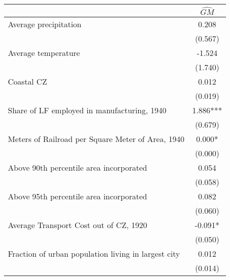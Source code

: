  \begin{tabular}{l*{1}{c}} \toprule
                &\multicolumn{1}{c}{$\widehat{GM}$}\\
\midrule
Average precipitation&    0.208   \\
                &  (0.567)   \\
\addlinespace
Average temperature&   -1.524   \\
                &  (1.740)   \\
\addlinespace
Coastal CZ      &    0.012   \\
                &  (0.019)   \\
\addlinespace
Share of LF employed in manufacturing, 1940&    1.886***\\
                &  (0.679)   \\
\addlinespace
Meters of Railroad per Square Meter of Area, 1940&    0.000*  \\
                &  (0.000)   \\
\addlinespace
Above 90th percentile area incorporated&    0.054   \\
                &  (0.058)   \\
\addlinespace
Above 95th percentile area incorporated&    0.082   \\
                &  (0.060)   \\
\addlinespace
Average Transport Cost out of CZ, 1920&   -0.091*  \\
                &  (0.050)   \\
\addlinespace
Fraction of urban population living in largest city&    0.012   \\
                &  (0.014)   \\
       \bottomrule \end{tabular}

